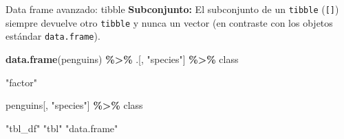 \documentclass[
  ignorenonframetext,
  aspectratio=169]{beamer}
\newenvironment{Shaded}{\begin{snugshade}}{\end{snugshade}}
\newcommand{\FunctionTok}[1]{\textcolor[rgb]{0.13,0.29,0.53}{\textbf{#1}}}
\newcommand{\NormalTok}[1]{#1}
\newcommand{\SpecialCharTok}[1]{\textcolor[rgb]{0.81,0.36,0.00}{\textbf{#1}}}
\newcommand{\StringTok}[1]{\textcolor[rgb]{0.31,0.60,0.02}{#1}}
\let\oldverbatim\verbatim
\let\endoldverbatim\endverbatim
\renewenvironment{verbatim}{\tiny\oldverbatim}{\endoldverbatim}
\begin{document}
\begin{frame}[fragile]{Data frame avanzado: tibble}
\label{data-frame-avanzado-tibble-8}
\textbf{Subconjunto:} El subconjunto de un \texttt{tibble}
(\texttt{{[}{]}}) siempre devuelve otro \texttt{tibble} y nunca un
vector (en contraste con los objetos estándar \texttt{data.frame}).

\begin{Shaded}
\begin{Highlighting}[]
\FunctionTok{data.frame}\NormalTok{(penguins) }\SpecialCharTok{\%\textgreater{}\%}\NormalTok{ .[, }\StringTok{"species"}\NormalTok{] }\SpecialCharTok{\%\textgreater{}\%}\NormalTok{ class}
\end{Highlighting}
\end{Shaded}

\begin{verbatim}
[1] "factor"
\end{verbatim}

\begin{Shaded}
\begin{Highlighting}[]
\NormalTok{penguins[, }\StringTok{"species"}\NormalTok{] }\SpecialCharTok{\%\textgreater{}\%}\NormalTok{ class}
\end{Highlighting}
\end{Shaded}

\begin{verbatim}
[1] "tbl_df"     "tbl"        "data.frame"
\end{verbatim}
\end{frame}
\end{document}
